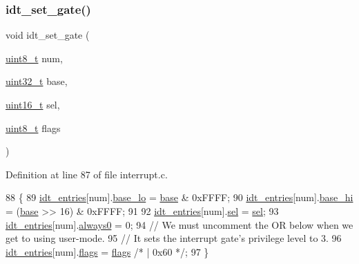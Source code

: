 \subsubsection{\texorpdfstring{idt\+\_\+set\+\_\+gate()}{idt\_set\_gate()}}
{\footnotesize\ttfamily void idt\+\_\+set\+\_\+gate (\begin{DoxyParamCaption}\item[{\hyperlink{a00140_aba7bc1797add20fe3efdf37ced1182c5_aba7bc1797add20fe3efdf37ced1182c5}{uint8\+\_\+t}}]{num,  }\item[{\hyperlink{a00140_a435d1572bf3f880d55459d9805097f62_a435d1572bf3f880d55459d9805097f62}{uint32\+\_\+t}}]{base,  }\item[{\hyperlink{a00140_a273cf69d639a59973b6019625df33e30_a273cf69d639a59973b6019625df33e30}{uint16\+\_\+t}}]{sel,  }\item[{\hyperlink{a00140_aba7bc1797add20fe3efdf37ced1182c5_aba7bc1797add20fe3efdf37ced1182c5}{uint8\+\_\+t}}]{flags }\end{DoxyParamCaption})}



Definition at line 87 of file interrupt.\+c.


\begin{DoxyCode}
88 \{
89     \hyperlink{a00110_a02c62ffc54da283f5faaa40b125d2dce_a02c62ffc54da283f5faaa40b125d2dce}{idt\_entries}[num].\hyperlink{a00234_a4b5fce0881deb4959d33da77d1ed0202_a4b5fce0881deb4959d33da77d1ed0202}{base\_lo} = \hyperlink{a00104_a0523cedff47e2441fc198b7770ec5d3f_a0523cedff47e2441fc198b7770ec5d3f}{base} & 0xFFFF;
90     \hyperlink{a00110_a02c62ffc54da283f5faaa40b125d2dce_a02c62ffc54da283f5faaa40b125d2dce}{idt\_entries}[num].\hyperlink{a00234_af46adb2603d1d8b4a3bedf7f1c6daed4_af46adb2603d1d8b4a3bedf7f1c6daed4}{base\_hi} = (\hyperlink{a00104_a0523cedff47e2441fc198b7770ec5d3f_a0523cedff47e2441fc198b7770ec5d3f}{base} >> 16) & 0xFFFF;
91 
92     \hyperlink{a00110_a02c62ffc54da283f5faaa40b125d2dce_a02c62ffc54da283f5faaa40b125d2dce}{idt\_entries}[num].\hyperlink{a00234_a3c9321c263139e56901a05efee220047_a3c9321c263139e56901a05efee220047}{sel}     = \hyperlink{a00110_af0b0a7e10694e3b600c7561311cc8271_af0b0a7e10694e3b600c7561311cc8271}{sel};
93     \hyperlink{a00110_a02c62ffc54da283f5faaa40b125d2dce_a02c62ffc54da283f5faaa40b125d2dce}{idt\_entries}[num].\hyperlink{a00234_adc747b3ff87142c71b7b8c51e03c067c_adc747b3ff87142c71b7b8c51e03c067c}{always0} = 0;
94     \textcolor{comment}{// We must uncomment the OR below when we get to using user-mode.}
95     \textcolor{comment}{// It sets the interrupt gate's privilege level to 3.}
96     \hyperlink{a00110_a02c62ffc54da283f5faaa40b125d2dce_a02c62ffc54da283f5faaa40b125d2dce}{idt\_entries}[num].\hyperlink{a00234_a02277c77564820972ae5df0a37c80be0_a02277c77564820972ae5df0a37c80be0}{flags}   = \hyperlink{a00110_aa2585d779da0ab21273a8d92de9a0ebe_aa2585d779da0ab21273a8d92de9a0ebe}{flags} \textcolor{comment}{/* | 0x60 */};
97 \}
\end{DoxyCode}
\mbox{\label{a00107_a35fe413107af682030ab7a4b6dff19b8_a35fe413107af682030ab7a4b6dff19b8}} 
